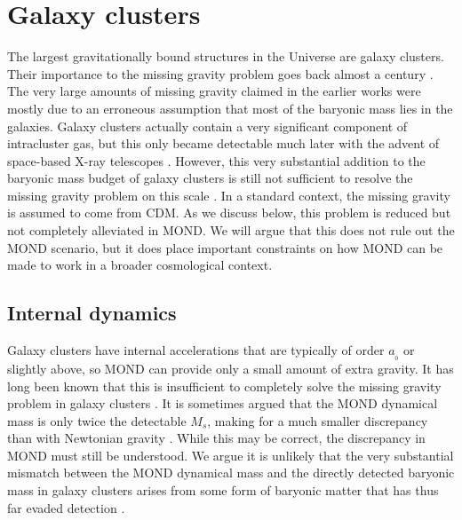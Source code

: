 \documentclass[fleqn,usenatbib,useAMS,onecolumn]{mnras} %
\begin{document}
\section{Galaxy clusters}
\label{Galaxy_clusters}

The largest gravitationally bound structures in the Universe are galaxy clusters. Their importance to the missing gravity problem goes back almost a century \citep{Zwicky_1933, Zwicky_1937}. The very large amounts of missing gravity claimed in the earlier works were mostly due to an erroneous assumption that most of the baryonic mass lies in the galaxies. Galaxy clusters actually contain a very significant component of intracluster gas, but this only became detectable much later with the advent of space-based X-ray telescopes \citep{Sarazin_1986}. However, this very substantial addition to the baryonic mass budget of galaxy clusters is still not sufficient to resolve the missing gravity problem on this scale \citep[for a review, see][]{Allen_2011}. In a standard context, the missing gravity is assumed to come from CDM. As we discuss below, this problem is reduced but not completely alleviated in MOND. We will argue that this does not rule out the MOND scenario, but it does place important constraints on how MOND can be made to work in a broader cosmological context.



\subsection{Internal dynamics}
\label{Galaxy_cluster_internal_dynamics}

Galaxy clusters have internal accelerations that are typically of order $a_{_0}$ or slightly above, so MOND can provide only a small amount of extra gravity. It has long been known that this is insufficient to completely solve the missing gravity problem in galaxy clusters \citep{Sanders_1999, Aguirre_2001, Sanders_2003}. It is sometimes argued that the MOND dynamical mass is only twice the detectable $M_s$, making for a much smaller discrepancy than with Newtonian gravity \citep[e.g.][]{Milgrom_2015}. While this may be correct, the discrepancy in MOND must still be understood. We argue it is unlikely that the very substantial mismatch between the MOND dynamical mass and the directly detected baryonic mass in galaxy clusters arises from some form of baryonic matter that has thus far evaded detection \citep[though see][]{Milgrom_2015}.
\end{document}
